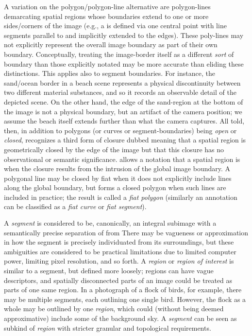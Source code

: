 {\begin{description}
A variation on the polygon/polygon-line alternative 
are polygon-lines demarcating spatial regions 
whose boundaries extend to one or more sides/corners 
of the image (e.g., a  is defined 
via one central point with line segments 
parallel to and implicitly 
extended to the edges).  These poly-lines 
may not explicitly represent the overall image 
boundary as part of their own boundary.  
Conceptually, treating the image-border itself 
as a different \textit{sort} of boundary than 
those explicitly notated may be more accurate 
than eliding these distinctions.  This 
applies also to segment boundaries.  For instance, 
the sand/ocean border in a beach scene represents 
a physical discontinuity between two different 
material substances, and so it records an 
observable detail of the depicted scene.  
On the other hand, the edge of the sand-region 
at the bottom of the image is not a physical 
boundary, but an artifact of the camera position; 
we assume the beach itself extends further than 
what the camera captures.  All told, then, 
in addition to polygons (or curves or segment-boundaries) 
being \textit{open} or \textit{closed}, \AXFI{} 
recognizes a third form of closure dubbed 
 meaning that a spatial region is 
geometrically closed by the edge of the image but 
that this closure has no observational or semantic 
significance.  \lAXFI{} allows a notation that 
a spatial region is  when the closure 
results from the intrusion of the global image boundary.  
A polygonal line may be closed by fiat when it does 
not explicitly include lines along the global boundary, 
but forms a closed polygon when such lines are 
included in practice; the result is called a 
\textit{fiat polygon} (similarly an annotation 
can be classified as a \textit{fiat curve} or 
\textit{fiat segment}).
   

\item[Segments and Regions]  A \textit{segment} is 
considered to be, canonically, an integral 
subimage with a semantically precise 
separation of  from   
There may be vagueness or approximation 
in how the segment is precisely individuated 
from its surroundings, but these ambiguities 
are considered to be practical limitations 
due to limited computer power, limiting pixel 
resolution, and so forth.  A \textit{region} 
or \textit{region of interest} is similar to a 
segment, but defined more loosely; regions 
can have vague descriptors, and spatially 
disconnected parts of an image could be treated 
as parts of one same region.  In a photograph 
of a flock of birds, for example, there may be 
multiple segments, each outlining one single bird.  
However, the flock as a whole may be outlined 
by one \textit{region}, which could (without 
being deemed approximative) include some of the 
background sky.  A \textit{segment} can be seen 
as subkind of \textit{region} with stricter 
granular and topological requirements. 


\end{description}}
